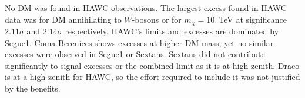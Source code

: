 No DM was found in HAWC observations.
The largest excess found in HAWC data was for DM annihilating to $W$-bosons or  for $m_\chi = 10$~TeV at significance $2.11\sigma$ and $2.14\sigma$ respectively.
HAWC's limits and excesses are dominated by Segue1.
Coma Berenices shows excesses at higher DM mass, yet no similar excesses were observed in Segue1 or Sextans.
Sextans did not contribute significantly to signal excesses or the combined limit as it is at high zenith.
Draco is at a high zenith for HAWC, so the effort required to include it was not justified by the benefits.

\begin{figure}[h]
\end{figure}
